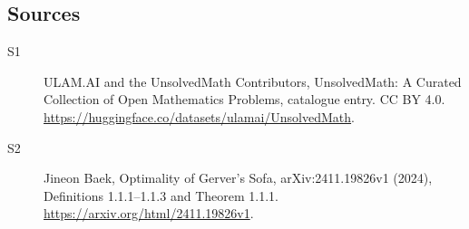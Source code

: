 \documentclass[11pt]{article}
\begin{document}
\subsection{Sources}
\begin{description}
\item[\hypertarget{source:statement:1}{S1}] ULAM.AI and the UnsolvedMath Contributors, UnsolvedMath: A Curated Collection of Open Mathematics Problems, catalogue entry. CC BY 4.0. \url{https://huggingface.co/datasets/ulamai/UnsolvedMath}.
\item[\hypertarget{source:statement:2}{S2}] Jineon Baek, Optimality of Gerver’s Sofa, arXiv:2411.19826v1 (2024), Definitions 1.1.1--1.1.3 and Theorem 1.1.1. \url{https://arxiv.org/html/2411.19826v1}.
\end{description}
\label{end:statement}
\end{document}
